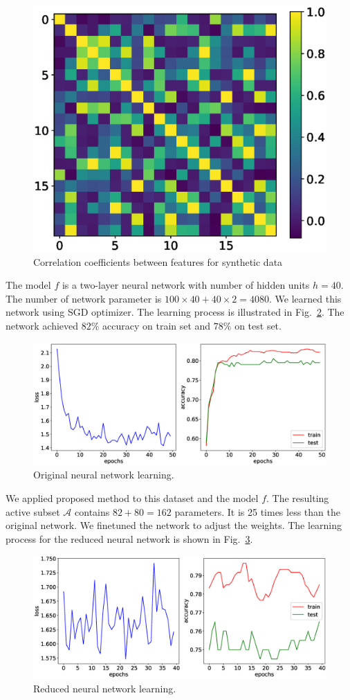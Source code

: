 \documentclass[a4paper,12pt]{article}
\theoremstyle{plain} %
\theoremstyle{definition} %
\theoremstyle{remark} %
\newcommand{\cA}{\mathcal{A}}
\begin{document}
	\begin{figure}[h]
		\centering
		\includegraphics[width=0.7\linewidth]{figs/corr.eps}
		\caption{Correlation coefficients between features for synthetic data}
		\label{fig:corr_matrix}
	\end{figure}

	The model $f$ is a two-layer neural network with number of hidden units $h=40$.
	The number of network parameter is $100 \times  40 + 40 \times 2 = 4080.$
	We learned this network using SGD optimizer.
	The learning process is illustrated in Fig.~\ref{fig:learning_orig}.
	The network achieved $82\%$ accuracy on train set and $78\%$ on test set.
	
	\begin{figure}[h]
		\centering
		\includegraphics[width=\linewidth]{figs/orig_net.eps}
		\caption{Original neural network learning.}
		\label{fig:learning_orig}
	\end{figure}

	We applied proposed method to this dataset and the model $f$. The resulting active subset $\cA$ contains $82 + 80 = 162$ parameters. It is 25 times less than the original network.
	We finetuned the network to adjust the weights.
	The learning process for the reduced neural network is shown in Fig.~\ref{fig:learning_reduced}.

	\begin{figure}[h]
		\centering
		\includegraphics[width=\linewidth]{figs/reduced_net.eps}
		\caption{Reduced neural network learning.}
		\label{fig:learning_reduced}
	\end{figure}
	
\end{document}
